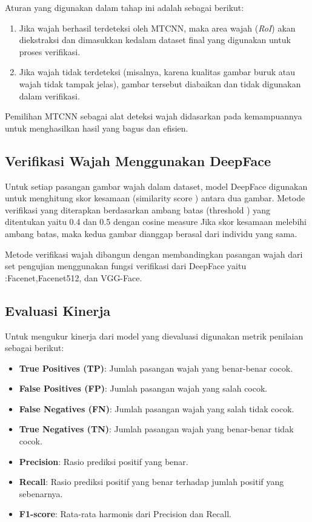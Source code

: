 \documentclass[a4paper, 11pt]{article}
\begin{document}
Aturan yang digunakan dalam tahap ini adalah sebagai berikut:

\begin{enumerate}
    \item Jika wajah berhasil terdeteksi oleh MTCNN, maka area wajah (\textit{RoI}) akan diekstraksi dan dimasukkan kedalam dataset final yang digunakan untuk proses verifikasi.
    \item Jika wajah tidak terdeteksi (misalnya, karena kualitas gambar buruk atau wajah tidak tampak jelas), gambar tersebut diabaikan dan tidak digunakan dalam verifikasi.
\end{enumerate}

Pemilihan MTCNN sebagai alat deteksi wajah didasarkan pada kemampuannya untuk menghasilkan hasil yang bagus dan efisien.


\subsection{Verifikasi Wajah Menggunakan DeepFace}
Untuk setiap pasangan gambar wajah dalam dataset, model DeepFace digunakan untuk menghitung skor kesamaan (similarity score ) antara dua gambar.
Metode verifikasi yang diterapkan berdasarkan ambang batas (threshold ) yang ditentukan yaitu 0.4 dan 0.5 dengan cosine measure Jika skor kesamaan melebihi ambang batas, maka kedua gambar dianggap berasal dari individu yang sama.

Metode verifikasi wajah dibangun dengan membandingkan pasangan wajah dari set pengujian menggunakan fungsi verifikasi dari DeepFace yaitu :Facenet,Facenet512, dan VGG-Face.

\subsection{Evaluasi Kinerja}

Untuk mengukur kinerja dari model yang dievaluasi digunakan metrik penilaian sebagai berikut:
\begin{itemize}
    \item \textbf{True Positives (TP)}: Jumlah pasangan wajah yang benar-benar cocok.
    \item \textbf{False Positives (FP)}: Jumlah pasangan wajah yang salah cocok.
    \item \textbf{False Negatives (FN)}: Jumlah pasangan wajah yang salah tidak cocok.
    \item \textbf{True Negatives (TN)}: Jumlah pasangan wajah yang benar-benar tidak cocok.
    \item \textbf{Precision}: Rasio prediksi positif yang benar.
    \item \textbf{Recall}: Rasio prediksi positif yang benar terhadap jumlah positif yang sebenarnya.
    \item \textbf{F1-score}: Rata-rata harmonis dari Precision dan Recall.
\end{itemize}
\end{document}
